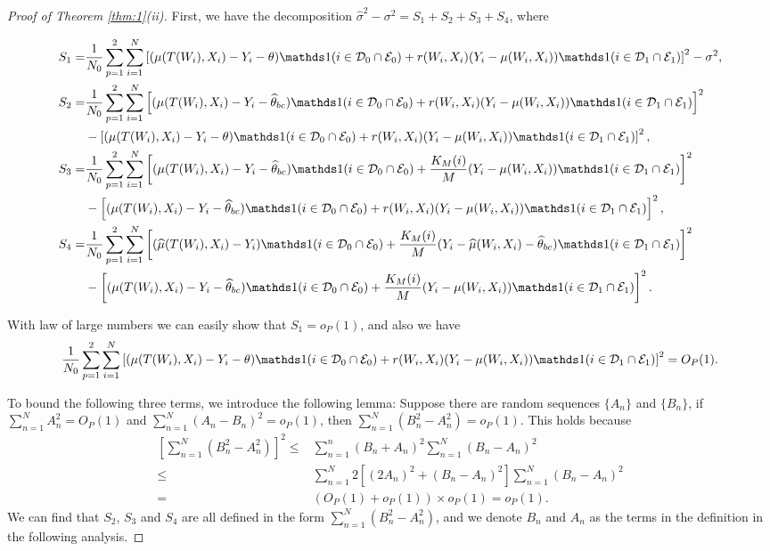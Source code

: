 \documentclass[11pt]{article}
\numberwithin{equation}{section}
\theoremstyle{definition}
\begin{document}
\begin{proof}[Proof of Theorem \ref{thm:1}(ii)]
First, we have the decomposition $\hat{\sigma}^2 - \sigma^2 = S_1 + S_2 + S_3 + S_4$, where

\begin{align*}
S_1=&\frac{1}{N_0}\sum_{p=1}^2\sum_{i=1}^N\left[(\mu(T(W_i),X_i)-Y_i-\theta)\ind(i \in \mathcal{D}_0\cap\mathcal{E}_0)+r(W_i,X_i)(Y_{i}-\mu(W_{i},X_{i}))\ind(i \in \mathcal{D}_1\cap\mathcal{E}_1)\right]^2-\sigma^2,\\
S_2=&\frac{1}{N_0}\sum_{p=1}^2\sum_{i=1}^N\left[(\mu(T(W_i),X_i)-Y_i-\widehat{\theta}_{bc})\ind(i \in \mathcal{D}_0\cap\mathcal{E}_0)+r(W_i,X_i)(Y_{i}-\mu(W_{i},X_{i}))\ind(i \in \mathcal{D}_1\cap\mathcal{E}_1)\right]^2\\
&-\left[(\mu(T(W_i),X_i)-Y_i-\theta)\ind(i \in \mathcal{D}_0\cap\mathcal{E}_0)+r(W_i,X_i)(Y_{i}-\mu(W_{i},X_{i}))\ind(i \in \mathcal{D}_1\cap\mathcal{E}_1)\right]^2,\\
S_3=&\frac{1}{N_0}\sum_{p=1}^2\sum_{i=1}^N\left[(\mu(T(W_i),X_i)-Y_i-\widehat{\theta}_{bc})\ind(i \in \mathcal{D}_0\cap\mathcal{E}_0)+\frac{K_M(i)}{M}(Y_{i}-\mu(W_{i},X_{i}))\ind(i \in \mathcal{D}_1\cap\mathcal{E}_1)\right]^2\\
&-\left[(\mu(T(W_i),X_i)-Y_i-\widehat{\theta}_{bc})\ind(i \in \mathcal{D}_0\cap\mathcal{E}_0)+r(W_i,X_i)(Y_{i}-\mu(W_{i},X_{i}))\ind(i \in \mathcal{D}_1\cap\mathcal{E}_1)\right]^2,\\
S_4=&\frac{1}{N_0}\sum_{p=1}^2\sum_{i=1}^N\left[(\widehat{\mu}(T(W_i),X_i)-Y_i)\ind(i \in \mathcal{D}_0\cap\mathcal{E}_0)+\frac{K_M(i)}{M}(Y_{i}-\widehat{\mu}(W_{i},X_{i})-\widehat{\theta}_{bc})\ind(i \in \mathcal{D}_1\cap\mathcal{E}_1)\right]^2\\
&-\left[(\mu(T(W_i),X_i)-Y_i-\widehat{\theta}_{bc})\ind(i \in \mathcal{D}_0\cap\mathcal{E}_0)+\frac{K_M(i)}{M}(Y_{i}-\mu(W_{i},X_{i}))\ind(i \in \mathcal{D}_1\cap\mathcal{E}_1)\right]^2.
\end{align*}

With law of large numbers we can easily show that $S_1=o_P(1)$, and also we have
\[\frac{1}{N_0}\sum_{p=1}^2\sum_{i=1}^N\left[(\mu(T(W_i),X_i)-Y_i-\theta)\ind(i \in \mathcal{D}_0\cap\mathcal{E}_0)+r(W_i,X_i)(Y_{i}-\mu(W_{i},X_{i}))\ind(i \in \mathcal{D}_1\cap\mathcal{E}_1)\right]^2=O_P(1).\]

To bound the following three terms, we introduce the following lemma: Suppose there are random sequences $\{A_n\}$ and $\{B_n\}$, if \(\sum_{n=1}^NA_n^2=O_P(1)\) and \(\sum_{n=1}^N(A_n-B_n)^2=o_P(1)\), then \(\sum_{n=1}^N(B_n^2-A_n^2)=o_P(1).\) This holds because 
\begin{align*}
    \left[\sum_{n=1}^N(B_n^2-A_n^2)\right]^2\leq& \sum_{n=1}^n(B_n+A_n)^2\sum_{n=1}^N(B_n-A_n)^2\\
    \leq& \sum_{n=1}^N2\left[(2A_n)^2+(B_n-A_n)^2\right]\sum_{n=1}^N(B_n-A_n)^2\\
    =&(O_P(1)+o_P(1))\times o_P(1)=o_P(1).
\end{align*}
We can find that $S_2$, $S_3$ and $S_4$ are all defined in the form $\sum_{n=1}^N(B_n^2-A_n^2)$, and we denote $B_n$ and $A_n$ as the terms in the definition in the following analysis.


\end{proof}
\end{document}
